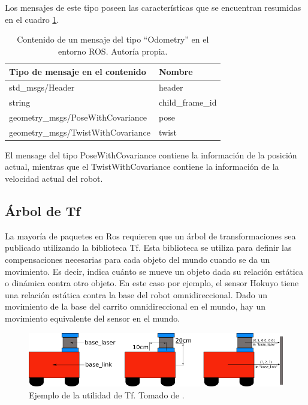Los mensajes de este tipo poseen las características que se encuentran resumidas en el cuadro \ref{T:odometría}.

\begin{table}[H]
\caption{Contenido de un mensaje del tipo ``Odometry'' en el entorno ROS. Autoría propia.}
\begin{tabular}{|l|l|}
\hline
Tipo de mensaje en el contenido    & Nombre           \\ \hline
std\_msgs/Header                   & header           \\ \hline
string                             & child\_frame\_id \\ \hline
geometry\_msgs/PoseWithCovariance  & pose             \\ \hline
geometry\_msgs/TwistWithCovariance & twist            \\ \hline
\end{tabular}
\label{T:odometría}
\end{table}

El mensage del tipo PoseWithCovariance contiene la información de la posición actual, mientras que el TwistWithCovariance contiene la información de la velocidad actual del robot.

\subsection{Árbol de Tf}

La mayoría de paquetes en Ros requieren que un árbol de transformaciones sea publicado utilizando la biblioteca Tf. Esta biblioteca se utiliza para definir las compensaciones necesarias para cada objeto del mundo cuando se da un movimiento. Es decir, indica cuánto se mueve un objeto dada su relación estática o dinámica contra otro objeto. En este caso por ejemplo, el sensor Hokuyo tiene una relación estática contra la base del robot omnidireccional. Dado un movimiento de la base del carrito omnidireccional en el mundo, hay un movimiento equivalente del sensor en el mundo.

\begin{figure}[H]
\centering
\includegraphics[scale=0.6]{imagenes/simple_robot.png}
\caption{Ejemplo de la utilidad de Tf. Tomado de \cite{ROSTF}.}
\label{F:tf}
\end{figure}

